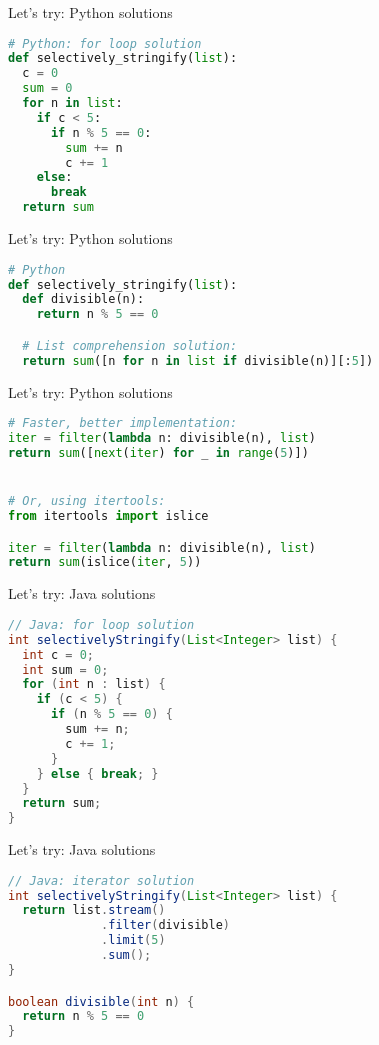 \documentclass[../index.tex]{subfiles}
\begin{document}
\renewcommand{\currenttitle}{Let's try: Python solutions}
\begin{frame}[fragile]{\currenttitle}
  \begin{lstlisting}[language=Python]
# Python: for loop solution
def selectively_stringify(list):
  c = 0
  sum = 0
  for n in list:
    if c < 5:
      if n % 5 == 0:
        sum += n
        c += 1
    else:
      break
  return sum
  \end{lstlisting}
\end{frame}

\begin{frame}[fragile]{\currenttitle}
  \begin{lstlisting}[language=Python]
# Python
def selectively_stringify(list):
  def divisible(n):
    return n % 5 == 0

  # List comprehension solution:
  return sum([n for n in list if divisible(n)][:5])
  \end{lstlisting}
\end{frame}

\begin{frame}[fragile]{\currenttitle}
  \begin{lstlisting}[language=Python]
# Faster, better implementation:
iter = filter(lambda n: divisible(n), list)
return sum([next(iter) for _ in range(5)])


# Or, using itertools:
from itertools import islice

iter = filter(lambda n: divisible(n), list)
return sum(islice(iter, 5))
  \end{lstlisting}
\end{frame}

\renewcommand{\currenttitle}{Let's try: Java solutions}
\begin{frame}[fragile]{\currenttitle}
  \begin{lstlisting}[language=Java]
// Java: for loop solution
int selectivelyStringify(List<Integer> list) {
  int c = 0;
  int sum = 0;
  for (int n : list) {
    if (c < 5) {
      if (n % 5 == 0) {
        sum += n;
        c += 1;
      }
    } else { break; }
  }
  return sum;
}
  \end{lstlisting}
\end{frame}

\begin{frame}[fragile]{\currenttitle}
  \begin{lstlisting}[language=Java]
// Java: iterator solution
int selectivelyStringify(List<Integer> list) {
  return list.stream()
             .filter(divisible)
             .limit(5)
             .sum();
}

boolean divisible(int n) {
  return n % 5 == 0
}
  \end{lstlisting}
\end{frame}
\end{document}

